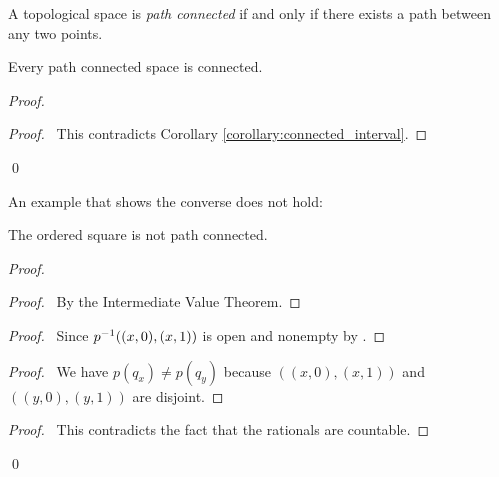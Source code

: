 \begin{definition}
    A topological space is \emph{path connected} if and only if there exists a path between any two points.
\end{definition}

\begin{proposition}
    \label{proposition:connected_path_connected}
    Every path connected space is connected.
\end{proposition}

\begin{proof}
    \pf
    \qedstep
    \begin{proof}
        \pf\ This contradicts Corollary \ref{corollary:connected_interval}.
    \end{proof}
    \qed
\end{proof}

An example that shows the converse does not hold:
\begin{example}
    The ordered square is not path connected.

    \begin{proof}
        \pf
        \begin{proof}
            \pf\ By the Intermediate Value Theorem.
        \end{proof}
        \begin{proof}
            \pf\ Since ${p}^{-1}((x,0),(x,1))$ is open and nonempty by .
        \end{proof}
        \begin{proof}
            \pf\ We have $p(q_x) \neq p(q_y)$ because $((x,0),(x,1))$ and $((y,0),(y,1))$ are disjoint.
        \end{proof}
        \qedstep
        \begin{proof}
            \pf\ This contradicts the fact that the rationals are countable.
        \end{proof}
        \qed
    \end{proof}
\end{example}

